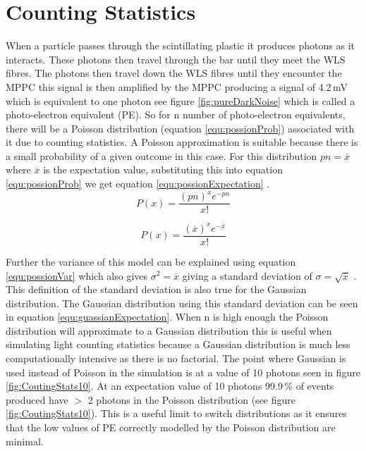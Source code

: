 \section{Counting Statistics} \label{sec:GEANT4Simulation_countingStats}
When a particle passes through the scintillating plastic it produces photons as it interacts. These photons then travel through the bar until they meet the WLS fibres. The photons then travel down the WLS fibres until they encounter the MPPC  this signal is then amplified by the MPPC producing a signal of 4.2\,mV which is equivalent to one photon see figure \ref{fig:pureDarkNoise} which is called a photo-electron equivalent (PE). So for n number of photo-electron equivalents, there will be a Poisson distribution (equation \ref{equ:possionProb}) associated with it due to counting statistics. A Poisson approximation is suitable because there is a small probability of a given outcome in this case. For this distribution $pn = \overline{x}$ where $\overline{x}$ is the expectation value, substituting this into equation \ref{equ:possionProb} we get equation \ref{equ:possionExpectation} \cite{knoll_2010}.
\begin{equation}
P(x) = \frac{(pn)^x e^{-pn}}{x!}  
\label{equ:possionProb}
\end{equation}

\begin{equation}
P(x) = \frac{(\overline{x})^x e^{-\overline{x}}}{x!}  
\label{equ:possionExpectation}
\end{equation}

Further the variance of this model can be explained using equation  \ref{equ:possionVar} which also gives $\sigma^2 = \overline{x}$ giving a standard deviation of $\sigma = \sqrt{\overline{x}}$ \cite{knoll_2010}. This definition of the standard deviation is also true for the Gaussian distribution. The Gaussian distribution using this standard deviation can be seen in equation \ref{equ:guassianExpectation}. When n is high enough the Poisson distribution will approximate to a Gaussian distribution this is useful when simulating light counting statistics because a Gaussian distribution is much less computationally intensive as there is no factorial. The point where Gaussian is used instead of Poisson in the simulation is at a value of 10 photons seen in figure \ref{fig:CoutingStats10}. At an expectation value of 10 photons 99.9\,\% of events produced have $>$ 2 photons in the Poisson distribution (see figure \ref{fig:CoutingStats10}). This is a useful limit to switch distributions as it ensures that the low values of PE correctly modelled by the Poisson distribution are minimal. 

